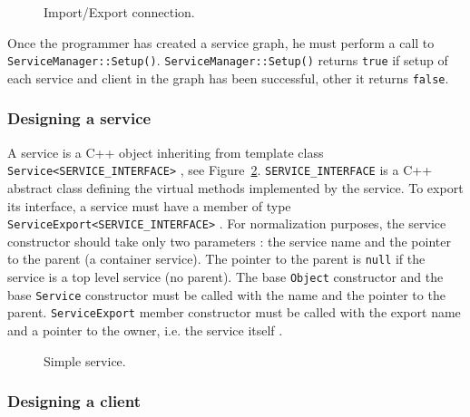 \begin{figure}[h]
  \begin{center}
    
    \caption{\label{fig:tms320c3x_service_connection} Import/Export connection.}
  \end{center}
\end{figure}

Once \hfill the \hfill programmer \hfill has \hfill created \hfill a \hfill service \hfill graph, \hfill he \hfill must \hfill perform \hfill a \hfill call \hfill to \hfill \texttt{ServiceManager::Setup()}.
\texttt{ServiceManager::Setup()} returns \texttt{true} if setup of each service and client in the graph has been successful, other it returns \texttt{false}.

\subsubsection{Designing a service}

A service is a C++ object inheriting from template class \texttt{Service<SERVICE\_INTERFACE>} , see Figure~\ref{fig:tms320c3x_simple_service}.
\texttt{SERVICE\_INTERFACE} is a C++ abstract class defining the virtual methods implemented by the service.
To export its interface, a service must have a member of type \texttt{ServiceExport<SERVICE\_INTERFACE>} .
For normalization purposes, the service constructor should take only two parameters : the service name and the pointer to the parent (a container service).
The pointer to the parent is \texttt{null} if the service is a top level service (no parent).
The base \texttt{Object} constructor  and the base \texttt{Service} constructor  must be called with the name and the pointer to the parent.
\texttt{ServiceExport} member constructor must be called with the export name and a pointer to the owner, i.e. the service itself .

\begin{figure}[h]
  \begin{center}
    
    \caption{\label{fig:tms320c3x_simple_service} Simple service.}
  \end{center}
\end{figure}

\subsubsection{Designing a client}

